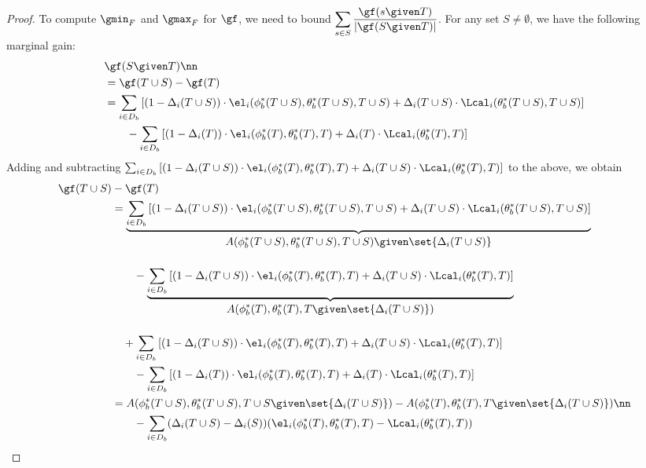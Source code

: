 \begin{proof}
To compute $\gmin_F$ and $  \gmax_F$ for $\gf$, we need to bound $\displaystyle \sum_{s\in S}\frac{\gf(s \given     T)}{|\gf(S \given     T)|}$.  For any set $S\neq \emptyset$,  we have the following marginal gain:
\begin{align}
 &  \gf(S \given T)\nn\\
 &   =  \gf   (T\cup S) - \gf(T)  \nonumber\\
    & = {\sum_{i\in D_b}\left[(1-\Delta_i(T \cup S)) \cdot \el_i(\phi_b ^*(T \cup S) , \theta_b ^*(T \cup S),  T\cup S) + \Delta_i(T \cup S) \cdot \Lcal_i (\theta _b ^*(T \cup S),  T\cup S) \right]} \nonumber \\
 &   \qquad - \sum_{i\in D_b} \left[(1-\Delta_i(T)) \cdot \el_i(\phi_b ^*(T) , \theta_b ^*(T), T) + \Delta_i(T) \cdot \Lcal_i (\theta _b ^*(T), T) \right]   
 \end{align}
Adding and subtracting   $ \sum_{i\in D_b}\left[(1-\Delta_i(T \cup S)) \cdot \el_i(\phi_b ^*(T) , \theta_b ^*(T), T) + \Delta_i(T \cup S) \cdot \Lcal_i (\theta _b ^*(T), T) \right]$
to the above, we obtain
 \begin{align}
  \gf   (T\cup S) & - \gf( T) \nonumber\\
& =  \underbrace{\sum_{i\in D_b}\left[(1-\Delta_i(T \cup S)) \cdot \el_i(\phi_b ^*(T \cup S) , \theta_b ^*(T \cup S), T\cup S) + \Delta_i(T \cup S) \cdot \Lcal_i (\theta _b ^*(T \cup S),  T\cup S) \right]}_{ \displaystyle A(\phi_b ^* (T\cup S), \theta_b ^* (T\cup S), T\cup S) \given \set{\Delta_i (T\cup S)} }\nonumber \\[3ex]
 &   \qquad -  \underbrace{\sum_{i\in D_b}\left[(1-\Delta_i(T \cup S)) \cdot \el_i(\phi_b ^*(T) , \theta_b ^*(T), T) + \Delta_i(T \cup S) \cdot \Lcal_i (\theta _b ^*(T), T) \right]}_{\displaystyle A(\phi_b ^* (T), \theta_b ^* (T), T\given \set{\Delta_i (T\cup S)})}\nonumber  \\[3ex]
 & \quad +   \sum_{i\in D_b}\left[(1-\Delta_i(T \cup S)) \cdot \el_i(\phi_b ^*(T) , \theta_b ^*(T), T) + \Delta_i(T \cup S) \cdot \Lcal_i (\theta _b ^*(T), T) \right]\nonumber \\
  &   \qquad - \sum_{i\in D_b} \left[(1-\Delta_i(T)) \cdot \el_i(\phi_b ^*(T) , \theta_b ^*(T), T) + \Delta_i(T) \cdot \Lcal_i (\theta _b ^*(T), T) \right]   \nonumber \\ 
  &  = A(\phi^* _b (T\cup S),  \theta^* _b (T\cup S), T\cup S \given \set{\Delta_i (T\cup S)}) - A(\phi^* _b (T),  \theta^* _b (T), T \given \set{\Delta_i (T\cup S)})  \nn \\
 & \qquad   - \sum_{i\in D_b}(\Delta_i(T\cup S) - \Delta_i (S) ) ( \el_i(\phi_b ^*(T) , \theta_b ^*(T), T) - \Lcal_i (\theta _b ^*(T), T) ) \label{eq:int0} 

\end{align}
\end{proof}
